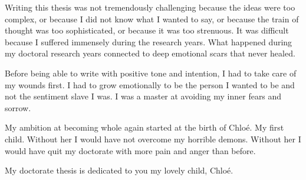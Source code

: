 Writing this thesis was not tremendously challenging because the ideas were too complex, or because I did not know what I wanted to say, or because the train of thought was too sophisticated, or because it was too strenuous. It was difficult because I suffered immensely during the research years. What happened during my doctoral research years connected to deep emotional scars that never healed. 

Before being able to write with positive tone and intention, I had to take care of my wounds first. I had to grow emotionally to be the person I wanted to be and not the sentiment slave I was. I was a master at avoiding my inner fears and sorrow. 

My ambition at becoming whole again started at the birth of Chloé. My first child. Without her I would have not overcome my horrible demons. Without her I would have quit my doctorate with more pain and anger than before. 

My doctorate thesis is dedicated to you my lovely child, Chloé. 